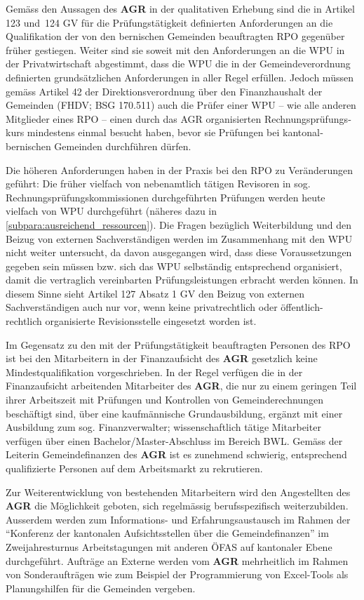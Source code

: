 \documentclass[10pt]{article}
\begin{document}
Gemäss den Aussagen des \textbf{AGR} in der qualitativen Erhebung sind die in Artikel 123 und~124 GV für die Prüfungstätigkeit definierten Anforderungen an die Qualifikation der von den bernischen Gemeinden beauftragten RPO gegenüber früher gestiegen. Weiter sind sie soweit mit den Anforderungen an die WPU in der Privatwirtschaft abgestimmt, dass die WPU die in der Gemeindeverordnung definierten grundsätzlichen Anforderungen in aller Regel erfüllen. Jedoch müssen gemäss Artikel 42 der Direktionsverordnung über den Finanz­haushalt der Gemeinden (FHDV; BSG 170.511) auch die Prüfer einer WPU -- wie alle anderen Mitglieder eines RPO -- einen durch das AGR organisierten Rechnungs­prüfungs­kurs mindestens einmal besucht haben, bevor sie Prüfungen bei kantonal­bernischen Gemeinden durchführen dürfen.

Die höheren Anforderungen haben in der Praxis bei den RPO zu Veränderungen geführt: Die früher vielfach von nebenamtlich tätigen Revisoren in sog. Rechnungsprüfungs­kommissionen durchgeführten Prüfungen werden heute vielfach von WPU durchgeführt (näheres dazu in \vref{subpara:ausreichend_ressourcen}). Die Fragen bezüglich Weiterbildung und den Beizug von externen Sachver­ständigen werden im Zusammenhang mit den WPU nicht weiter untersucht, da davon ausgegangen wird, dass diese Voraussetzungen gegeben sein müssen bzw. sich das WPU selbständig entsprechend organisiert, damit die vertraglich vereinbarten Prüfungsleistungen erbracht werden können. In diesem Sinne sieht Artikel 127 Absatz 1 GV den Beizug von externen Sachverständigen auch nur vor, wenn keine privatrechtlich oder öffentlich-rechtlich organisierte Revisionsstelle eingesetzt worden ist.

Im Gegensatz zu den mit der Prüfungstätigkeit beauftragten Personen des RPO ist bei den Mitarbeitern in der Finanzaufsicht des \textbf{AGR} gesetzlich keine Mindestqualifikation vorgeschrieben. In der Regel verfügen die in der Finanzaufsicht arbeitenden Mitarbeiter des \textbf{AGR}, die nur zu einem geringen Teil ihrer Arbeitszeit mit Prüfungen und Kontrollen von Gemeinderechnungen beschäftigt sind, über eine kaufmännische Grundausbildung, ergänzt mit einer Ausbildung zum sog. Finanzverwalter; wissenschaftlich tätige Mitarbeiter verfügen über einen Bachelor/Master-Abschluss im Bereich BWL. Gemäss der Leiterin Gemeindefinanzen des \textbf{AGR} ist es zunehmend schwierig, entsprechend qualifizierte Personen auf dem Arbeitsmarkt zu rekrutieren. 

Zur Weiterentwicklung von bestehenden Mitarbeitern wird den Angestellten des \textbf{AGR} die Möglichkeit geboten, sich regelmässig berufsspezifisch weiterzubilden. Ausserdem werden zum Informations- und Erfahrungsaustausch im Rahmen der “{}Konferenz der kantonalen Aufsichtsstellen über die Gemeindefinanzen”{} im Zweijahresturnus Arbeits­tagungen mit anderen ÖFAS auf kantonaler Ebene durchgeführt. Aufträge an Externe werden vom \textbf{AGR} mehrheitlich im Rahmen von Sonderaufträgen wie zum Beispiel der Programmierung von Excel-Tools als Planungshilfen für die Gemeinden vergeben.
\end{document}
